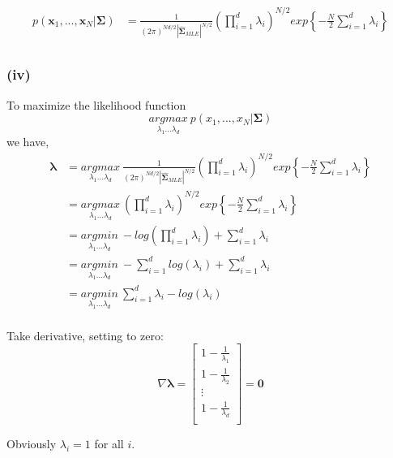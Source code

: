 \documentclass[11pt]{article}
\begin{document}
\begin{equation}
\begin{split}
p(\pmb{x}_1,...,\pmb{x}_N|\pmb{\Sigma})&=\frac{1}{(2\pi)^{Nd/2}|\hat{\pmb{\Sigma}}_{MLE}|^{N/2}}(\prod_{i=1}^{d}\lambda_i)^{N/2}exp\left\{-\frac{N}{2}\sum_{i=1}^{d}\lambda_i\right\}\\
\end{split}
\end{equation}

\pagebreak
\subsubsection*{(iv)}
To maximize the likelihood function $$\underset{\lambda_1...\lambda_d}{argmax}\ p(x_1,...,x_N|\pmb{\Sigma})$$
we have,
\begin{equation}
\begin{split}
\pmb{\lambda}&=\underset{\lambda_1...\lambda_d}{argmax}\  \frac{1}{(2\pi)^{Nd/2}|\hat{\pmb{\Sigma}}_{MLE}|^{N/2}}(\prod_{i=1}^{d}\lambda_i)^{N/2}exp\left\{-\frac{N}{2}\sum_{i=1}^{d}\lambda_i\right\}\\
&=\underset{\lambda_1...\lambda_d}{argmax}\ (\prod_{i=1}^{d}\lambda_i)^{N/2}exp\left\{-\frac{N}{2}\sum_{i=1}^{d}\lambda_i\right\}\\
&=\underset{\lambda_1...\lambda_d}{argmin}\ -log(\prod_{i=1}^{d}\lambda_i)+\sum_{i=1}^{d}\lambda_i\\
&=\underset{\lambda_1...\lambda_d}{argmin}\ -\sum_{i=1}^{d}log(\lambda_i)+\sum_{i=1}^{d}\lambda_i\\
&=\underset{\lambda_1...\lambda_d}{argmin}\ \sum_{i=1}^{d}\lambda_i-log(\lambda_i)\\
\end{split}
\end{equation}

Take derivative, setting to zero:
$$\nabla\pmb{\lambda}= \begin{bmatrix}
1-\frac{1}{\lambda_1}\\
1-\frac{1}{\lambda_2}\\
\vdots\\
1-\frac{1}{\lambda_d}\\
\end{bmatrix} = \pmb{0}$$

Obviously $\lambda_i=1$ for all $i$.
\end{document}
